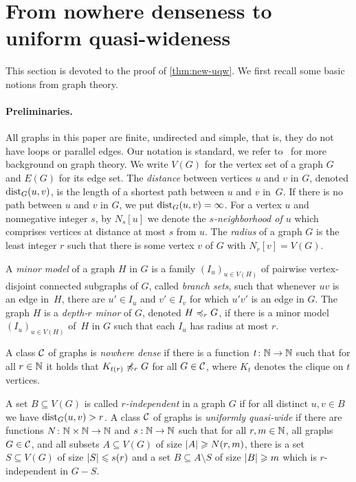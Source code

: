 \section{From nowhere denseness to uniform quasi-wideness}\label{sec:uqw}

This section is devoted to the proof of \cref{thm:new-uqw}. 
We first recall some basic notions from graph theory. 

\paragraph*{Preliminaries.}
All graphs in this paper are finite, undirected and simple, that is, 
they do not have loops or parallel edges. Our notation is standard,
we refer to~\cite{diestel2012graph} for more background on 
graph theory. 
We write $V(G)$ for the vertex set of a graph $G$ and
$E(G)$ for its edge set. 
The {\em{distance}} between vertices $u$ and $v$ in $G$, denoted $\mathrm{dist}_G(u,v)$, is the length of a shortest path between $u$ and $v$ in~$G$.
If there is no path between $u$ and $v$ in $G$, we put $\mathrm{dist}_G(u,v)=\infty$.
For a vertex $u$ and nonnegative integer $s$, by $N_s[u]$ we denote the {\em{$s$-neighborhood of $u$}} which comprises vertices at distance at most $s$ from $u$.
The \emph{radius} of a graph $G$ is the least integer $r$ such that there is some vertex $v$ of $G$ with $N_r[v]=V(G)$.


A {\em{minor model}} of a graph $H$ in $G$ is a family $(I_u)_{u\in V(H)}$ of pairwise vertex-disjoint connected subgraphs of $G$, called {\em{branch sets}},
such that whenever $uv$ is an edge in~$H$, there are $u'\in I_u$ and $v'\in I_v$ for which $u'v'$ 
is an edge in $G$.
The graph $H$ is a {\em{depth-$r$ minor}} of $G$, denoted $H\preccurlyeq_rG$, if there is a minor model
$(I_u)_{u\in V(H)}$ of~$H$ in $G$ such that each $I_u$ has radius at most $r$.

A class $\mathcal{C}$ of graphs is \emph{nowhere dense} if there is a function 
$t\colon \mathbb{N}\rightarrow \mathbb{N}$ such that for all $r\in \mathbb{N}$ it holds that $K_{t(r)}\not\preccurlyeq_r G$
for all $G\in \mathcal{C}$, where $K_t$ denotes the clique on $t$ vertices.

A set $B\subseteq V(G)$ is called {\em{$r$-independent}} in a graph $G$ if for all
distinct $u,v\in B$ we have $\mathrm{dist}_G(u,v)>r$.
A class $\mathcal{C}$ of graphs is \emph{uniformly quasi-wide} if there are
functions $N\colon \mathbb{N}\times\mathbb{N}\rightarrow \mathbb{N}$ and $s:\mathbb{N}\rightarrow \mathbb{N}$ such
that for all $r,m\in \mathbb{N}$, all graphs $G\in \mathcal{C}$, and all subsets $A\subseteq V(G)$ of size $\left\lvert A\right\rvert\geqslant N(r,m)$, there is a set
$S\subseteq V(G)$ of size $\left\lvert S\right\rvert\leqslant s(r)$ and a set
$B\subseteq A\setminus S$ of size $\left\lvert B\right\rvert\geqslant m$ which is $r$-independent in
$G-S$. 


